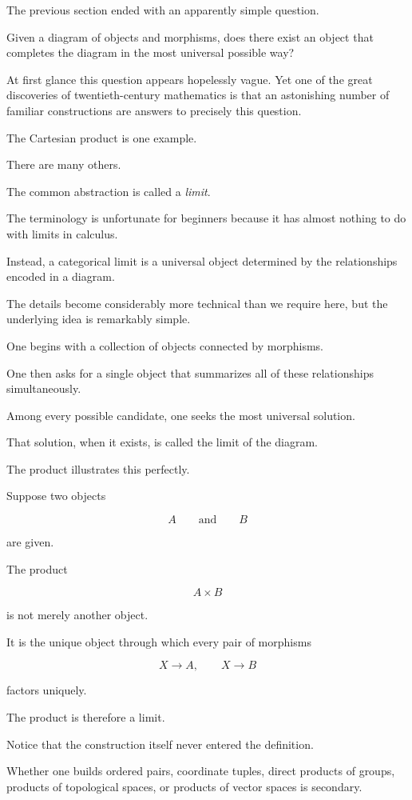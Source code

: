 \documentclass[11pt]{book}
\numberwithin{equation}{chapter}
\theoremstyle{definition}
\theoremstyle{plain}
\theoremstyle{remark}
\begin{document}
The previous section ended with an apparently simple question.

Given a diagram of objects and morphisms, does there exist an object that completes the diagram in the most universal possible way?

At first glance this question appears hopelessly vague. Yet one of the great discoveries of twentieth-century mathematics is that an astonishing number of familiar constructions are answers to precisely this question.

The Cartesian product is one example.

There are many others.

The common abstraction is called a \emph{limit}.

The terminology is unfortunate for beginners because it has almost nothing to do with limits in calculus.

Instead, a categorical limit is a universal object determined by the relationships encoded in a diagram.

The details become considerably more technical than we require here, but the underlying idea is remarkably simple.

One begins with a collection of objects connected by morphisms.

One then asks for a single object that summarizes all of these relationships simultaneously.

Among every possible candidate, one seeks the most universal solution.

That solution, when it exists, is called the limit of the diagram.

The product illustrates this perfectly.

Suppose two objects

\[
A
\qquad\text{and}\qquad
B
\]

are given.

The product

\[
A\times B
\]

is not merely another object.

It is the unique object through which every pair of morphisms

\[
X\rightarrow A,
\qquad
X\rightarrow B
\]

factors uniquely.

The product is therefore a limit.

Notice that the construction itself never entered the definition.

Whether one builds ordered pairs, coordinate tuples, direct products of groups, products of topological spaces, or products of vector spaces is secondary.
\end{document}
